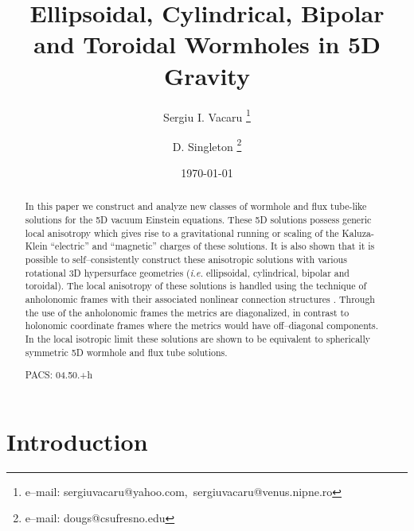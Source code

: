 \documentclass[a4paper,preprint,prabib,aps]{revtex4}
\begin{document}
\draft
\date{\today}
\title{Ellipsoidal, Cylindrical, Bipolar and Toroidal Wormholes in 5D Gravity }
\author{Sergiu I. Vacaru \thanks{
e--mail: sergiu\myHighlight{$_{-}$}\coordHE{}vacaru@yahoo.com,\ sergiuvacaru@venus.nipne.ro}}
\address{Physics Department, CSU Fresno, Fresno, CA 93740-8031, USA\\
and \\
Centro Multidisciplinar de Astrofisica - CENTRA, Departamento de Fisica,\\
Instituto Superior Tecnico, Av. Rovisco Pais 1, Lisboa, 1049-001,\\
Portugal}
\author{D. Singleton \thanks{
e--mail: dougs@csufresno.edu}}
\address{Physics Department, CSU Fresno, Fresno, CA 93740-8031, USA}

\begin{abstract}
In this paper we construct and analyze new classes of wormhole and flux
tube-like solutions for the 5D vacuum Einstein equations. These 5D solutions
possess generic local anisotropy which gives rise to a gravitational running
or scaling of the Kaluza-Klein ``electric'' and ``magnetic'' charges of
these solutions. It is also shown that it is possible to self--consistently
construct these anisotropic solutions with various rotational 3D
hypersurface geometries ({\it i.e.} ellipsoidal, cylindrical, bipolar and
toroidal). The local anisotropy of these solutions is handled using the
technique of anholonomic frames with their associated nonlinear connection
structures \cite{vst}. Through the use of the anholonomic frames the metrics
are diagonalized, in contrast to holonomic coordinate frames where the
metrics would have off--diagonal components. In the local isotropic limit
these solutions are shown to be equivalent to spherically symmetric 5D
wormhole and flux tube solutions.

\vspace{1cm} PACS: 04.50.+h

\end{abstract}

\maketitle

\vspace{1cm}

\section{Introduction}
\end{document}

